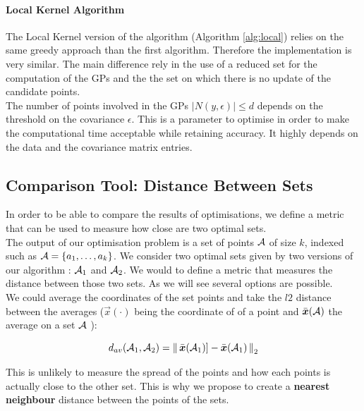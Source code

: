 \paragraph{Local Kernel Algorithm}

The Local Kernel version of the algorithm (Algorithm \ref{alg:local}) relies on the same greedy approach than the first algorithm. Therefore the implementation is very similar. The main difference rely in the use of a reduced set for the computation of the GPs and the the set on which there is no update of the candidate points. \\

The number of points involved in the GPs $|N(y,\epsilon)| \leq d $  depends on the threshold on the covariance $\epsilon$. This is a parameter to optimise in order to make the computational time acceptable while retaining accuracy. It highly depends on the data and the covariance matrix entries. 

 


\subsection{Comparison Tool: Distance Between Sets}

In order to be able to compare the results of optimisations, we define a metric that can be used to measure how close are two optimal sets. \\

The output of our optimisation problem is a set of points $\mathcal{A}$ of size $k$, indexed such as $\mathcal{A} = \{a_1, \dots, a_k\}$. We consider two optimal sets given by two versions of our algorithm : $\mathcal{A}_1$ and $\mathcal{A}_2$. We would to define a metric that measures the distance between those two sets. As we will see several options are possible. \\

We could average the coordinates of the set points and take the $l2$ distance between the averages ($\vec{x}(\cdot)$ being the coordinate of of a point and $\bar{{\boldsymbol{{x}}}}(\mathcal{A})$ the average on a set $\mathcal{A}$  ):

\begin{equation}
	d_{av}(\mathcal{A}_1,\mathcal{A}_2) =  \left\lVert \,\bar{{\boldsymbol{{x}}}}(\mathcal{A}_1)] - \bar{{\boldsymbol{{x}}}}(\mathcal{A}_1)\, \right\rVert_2
\end{equation}

This is unlikely to measure the spread of the points and how each points is actually close to the other set. This is why we propose to create  a \textbf{nearest neighbour} distance between the points of the sets. \\

